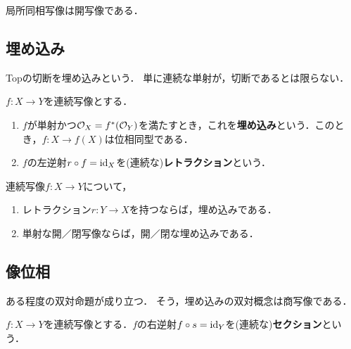 \documentclass[uplatex,dvipdfmx]{jsreport}
\begin{document}
\begin{proposition}
    局所同相写像は開写像である．
\end{proposition}

\subsection{埋め込み}

\begin{tcolorbox}[colframe=ForestGreen, colback=ForestGreen!10!white,breakable,colbacktitle=ForestGreen!40!white,coltitle=black,fonttitle=\bfseries\sffamily,
title=]
    Topの切断を埋め込みという．
    単に連続な単射が，切断であるとは限らない．
\end{tcolorbox}

\begin{definition}
    $f:X\to Y$を連続写像とする．
    \begin{enumerate}
        \item $f$が単射かつ$\mathcal{O}_X=f^*(\mathcal{O}_Y)$を満たすとき，これを\textbf{埋め込み}という．このとき，$f:X\to f(X)$は位相同型である．
        \item $f$の左逆射$r\circ f=\mathrm{id}_X$を(連続な)\textbf{レトラクション}という．
    \end{enumerate}
\end{definition}

\begin{proposition}[埋め込みであることの十分条件]
    連続写像$f:X\to Y$について，
    \begin{enumerate}
        \item レトラクション$r:Y\to X$を持つならば，埋め込みである．
        \item 単射な開／閉写像ならば，開／閉な埋め込みである．
    \end{enumerate}
\end{proposition}

\subsection{像位相}

\begin{tcolorbox}[colframe=ForestGreen, colback=ForestGreen!10!white,breakable,colbacktitle=ForestGreen!40!white,coltitle=black,fonttitle=\bfseries\sffamily,
title=]
    ある程度の双対命題が成り立つ．
    そう，埋め込みの双対概念は商写像である．
\end{tcolorbox}

\begin{definition}
    $f:X\to Y$を連続写像とする．$f$の右逆射$f\circ s=\mathrm{id}_Y$を(連続な)\textbf{セクション}という．
\end{definition}
\end{document}
